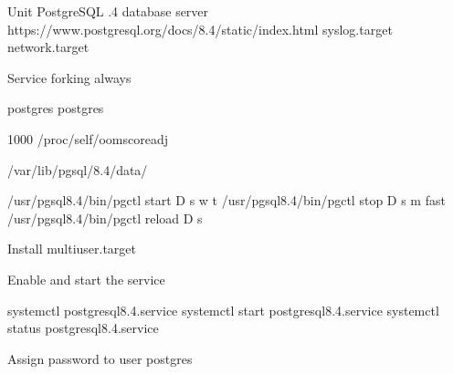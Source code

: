 \documentclass[letterpaper,10pt,english]{sphinxmanual}
\begin{document}
%
\begin{sphinxVerbatim}[commandchars=\\\{\}]
\PYG{o}{[}Unit\PYG{o}{]}
PostgreSQL .4 database server
https://www.postgresql.org/docs/8.4/static/index.html
syslog.target
network.target

\PYG{o}{[}Service\PYG{o}{]}
forking
always

postgres
postgres

\PYGZhy{}1000
/proc/self/oom\PYGZus{}score\PYGZus{}adj

/var/lib/pgsql/8.4/data/

/usr/pgsql\PYGZhy{}8.4/bin/pg\PYGZus{}ctl start \PYGZhy{}D  \PYGZhy{}s \PYGZhy{}w \PYGZhy{}t 
/usr/pgsql\PYGZhy{}8.4/bin/pg\PYGZus{}ctl stop \PYGZhy{}D  \PYGZhy{}s \PYGZhy{}m fast
/usr/pgsql\PYGZhy{}8.4/bin/pg\PYGZus{}ctl reload \PYGZhy{}D  \PYGZhy{}s


\PYG{o}{[}Install\PYG{o}{]}
multi\PYGZhy{}user.target
\end{sphinxVerbatim}

Enable and start the service

%
\begin{sphinxVerbatim}[commandchars=\\\{\}]
systemctl  postgresql\PYGZhy{}8.4.service
systemctl start postgresql\PYGZhy{}8.4.service
systemctl status postgresql\PYGZhy{}8.4.service
\end{sphinxVerbatim}

Assign password to user postgres
\end{document}
